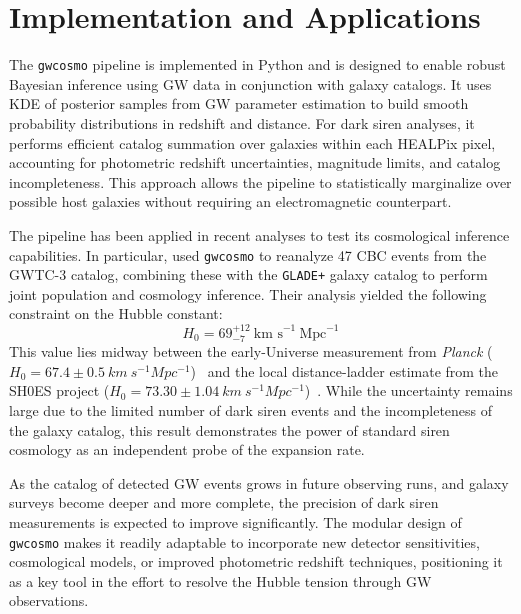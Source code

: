 \section{Implementation and Applications}

%

The \texttt{gwcosmo} pipeline is implemented in Python and is designed to enable robust Bayesian inference using \ac{GW} data in conjunction with galaxy catalogs. It uses \ac{KDE} of posterior samples from \ac{GW} parameter estimation to build smooth probability distributions in redshift and distance. For dark siren analyses, it performs efficient catalog summation over galaxies within each HEALPix pixel, accounting for photometric redshift uncertainties, magnitude limits, and catalog incompleteness. This approach allows the pipeline to statistically marginalize over possible host galaxies without requiring an electromagnetic counterpart.

The pipeline has been applied in recent analyses to test its cosmological inference capabilities. In particular, \citet{gray2023joint} used \texttt{gwcosmo} to reanalyze 47 \ac{CBC} events from the \ac{GWTC}-3 catalog, combining these with the \texttt{GLADE+} galaxy catalog to perform joint population and cosmology inference. Their analysis yielded the following constraint on the Hubble constant:
$$
H_0 = 69^{+12}_{-7}~\text{km s}^{-1}~\text{Mpc}^{-1}
$$
This value lies midway between the early-Universe measurement from \textit{Planck} ($H_0 = 67.4 \pm 0.5~km~s^{-1}Mpc^{-1}$)~\citep{Planck:2018vyg} and the local distance-ladder estimate from the \ac{SH0ES} project ($H_0 = 73.30 \pm 1.04~km~s^{-1}Mpc^{-1}$)~\citep{riess2022comprehensive}. While the uncertainty remains large due to the limited number of dark siren events and the incompleteness of the galaxy catalog, this result demonstrates the power of standard siren cosmology as an independent probe of the expansion rate.

As the catalog of detected \ac{GW} events grows in future observing runs, and galaxy surveys become deeper and more complete, the precision of dark siren measurements is expected to improve significantly. The modular design of \texttt{gwcosmo} makes it readily adaptable to incorporate new detector sensitivities, cosmological models, or improved photometric redshift techniques, positioning it as a key tool in the effort to resolve the Hubble tension through \ac{GW} observations.
